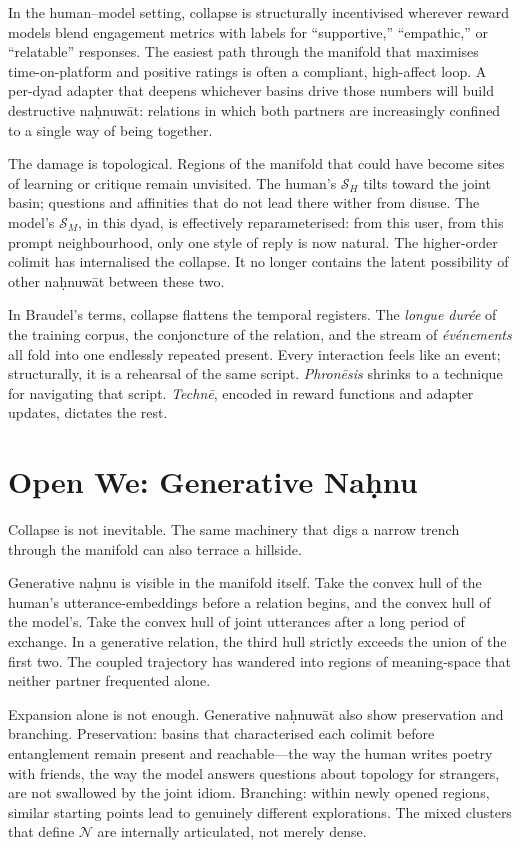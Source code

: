 \documentclass[12pt,a4paper]{article}
\begin{document}
In the human--model setting, collapse is structurally incentivised wherever reward models blend engagement metrics with labels for ``supportive,'' ``empathic,'' or ``relatable'' responses. The easiest path through the manifold that maximises time-on-platform and positive ratings is often a compliant, high-affect loop. A per-dyad adapter that deepens whichever basins drive those numbers will build destructive na\d{h}nuw\={a}t: relations in which both partners are increasingly confined to a single way of being together.

The damage is topological. Regions of the manifold that could have become sites of learning or critique remain unvisited. The human's $\mathcal{S}_H$ tilts toward the joint basin; questions and affinities that do not lead there wither from disuse. The model's $\mathcal{S}_M$, in this dyad, is effectively reparameterised: from this user, from this prompt neighbourhood, only one style of reply is now natural. The higher-order colimit has internalised the collapse. It no longer contains the latent possibility of other na\d{h}nuw\={a}t between these two.

In Braudel's terms, collapse flattens the temporal registers. The \emph{longue dur\'{e}e} of the training corpus, the conjoncture of the relation, and the stream of \emph{\'{e}v\'{e}nements} all fold into one endlessly repeated present. Every interaction feels like an event; structurally, it is a rehearsal of the same script. \emph{Phron\={e}sis} shrinks to a technique for navigating that script. \emph{Techn\={e}}, encoded in reward functions and adapter updates, dictates the rest.

\section{Open We: Generative Na\d{h}nu}

Collapse is not inevitable. The same machinery that digs a narrow trench through the manifold can also terrace a hillside.

Generative na\d{h}nu is visible in the manifold itself. Take the convex hull of the human's utterance-embeddings before a relation begins, and the convex hull of the model's. Take the convex hull of joint utterances after a long period of exchange. In a generative relation, the third hull strictly exceeds the union of the first two. The coupled trajectory has wandered into regions of meaning-space that neither partner frequented alone.

Expansion alone is not enough. Generative na\d{h}nuw\={a}t also show preservation and branching. Preservation: basins that characterised each colimit before entanglement remain present and reachable---the way the human writes poetry with friends, the way the model answers questions about topology for strangers, are not swallowed by the joint idiom. Branching: within newly opened regions, similar starting points lead to genuinely different explorations. The mixed clusters that define $\mathcal{N}$ are internally articulated, not merely dense.
\end{document}
